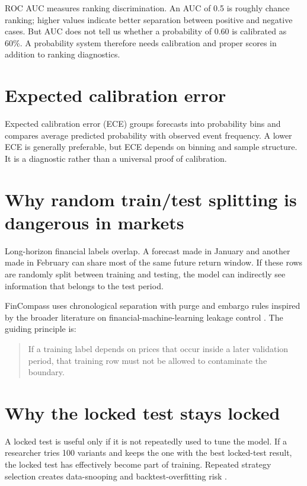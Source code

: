 \documentclass[11pt]{article}
\begin{document}
ROC AUC measures ranking discrimination. An AUC of 0.5 is roughly chance ranking; higher values indicate better separation between positive and negative cases. But AUC does not tell us whether a probability of 0.60 is calibrated as 60\%. A probability system therefore needs calibration and proper scores in addition to ranking diagnostics.

\section{Expected calibration error}

Expected calibration error (ECE) groups forecasts into probability bins and compares average predicted probability with observed event frequency. A lower ECE is generally preferable, but ECE depends on binning and sample structure. It is a diagnostic rather than a universal proof of calibration.

\section{Why random train/test splitting is dangerous in markets}

Long-horizon financial labels overlap. A forecast made in January and another made in February can share most of the same future return window. If these rows are randomly split between training and testing, the model can indirectly see information that belongs to the test period.

FinCompass uses chronological separation with purge and embargo rules inspired by the broader literature on financial-machine-learning leakage control \citep{lopezdeprado2018advances}. The guiding principle is:

\begin{quote}
If a training label depends on prices that occur inside a later validation period, that training row must not be allowed to contaminate the boundary.
\end{quote}

\section{Why the locked test stays locked}

A locked test is useful only if it is not repeatedly used to tune the model. If a researcher tries 100 variants and keeps the one with the best locked-test result, the locked test has effectively become part of training. Repeated strategy selection creates data-snooping and backtest-overfitting risk \citep{white2000reality,harvey2016crosssection,bailey2017pbo}.
\end{document}
